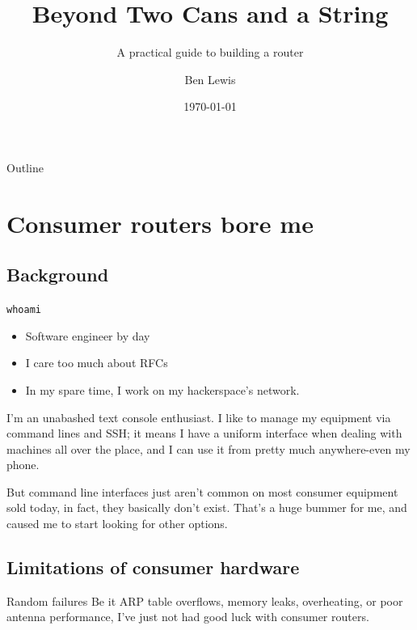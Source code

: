 \documentclass[bigger]{beamer}
\author{Ben Lewis}
\date{\today}
\title{Beyond Two Cans and a String}
\subtitle{A practical guide to building a router}
\begin{document}
\maketitle
\begin{frame}{Outline}
\tableofcontents
\end{frame}


\section{Consumer routers bore me}
\label{sec:org769d52d}

\subsection{Background}
\label{sec:orgb37081c}

\begin{frame}[fragile,label={sec:org06c16c6}]{\texttt{whoami}}
  \begin{itemize}
  \item Software engineer by day
  \item I care too much about RFCs
  \item In my spare time, I work on my hackerspace's network.
  \end{itemize}
\begin{notes}
I'm an unabashed text console enthusiast. I like to manage my equipment via
command lines and SSH; it means I have a uniform interface when dealing with
machines all over the place, and I can use it from pretty much anywhere-even my
phone.

But command line interfaces just aren't common on most consumer equipment sold
today, in fact, they basically don't exist. That's a huge bummer for me, and
caused me to start looking for other options.
\end{notes}

\end{frame}

\subsection{Limitations of consumer hardware}
\label{sec:orgbbeeef6}

\begin{frame}[label={sec:org6db040a}]{Random failures}
Be it ARP table overflows, memory leaks, overheating, or poor antenna
performance, I've just not had good luck with consumer routers.
\end{frame}
\end{document}
